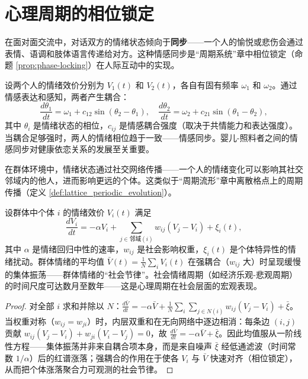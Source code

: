 \section{心理周期的相位锁定}

\begin{definition}[人际情感同步]\label{def:emotional_synchrony}
在面对面交流中，对话双方的情绪状态倾向于\textbf{同步}——一个人的愉悦或悲伤会通过表情、语调和肢体语言传递给对方。这种情感同步是“周期系统”章中相位锁定（命题 \ref{prop:phase-locking}）在人际互动中的实现。

设两个人的情绪效价分别为 $V_1(t)$ 和 $V_2(t)$，各自有固有频率 $\omega_1$ 和 $\omega_2$。通过情感表达和感知，两者产生耦合：
\[
\frac{d\theta_1}{dt} = \omega_1 + c_{12} \sin(\theta_2 - \theta_1), \quad \frac{d\theta_2}{dt} = \omega_2 + c_{21} \sin(\theta_1 - \theta_2),
\]
其中 $\theta_i$ 是情绪状态的相位，$c_{ij}$ 是情感耦合强度（取决于共情能力和表达强度）。当耦合足够强时，两人的情绪相位趋于一致——情感同步。婴儿-照料者之间的情感同步对健康依恋关系的发展至关重要。
\end{definition}

\begin{proposition}[群体情绪的传染性扩散]\label{prop:emotional_contagion}
在群体环境中，情绪状态通过社交网络传播——一个人的情绪变化可以影响其社交邻域内的他人，进而影响更远的个体。这类似于“周期流形”章中离散格点上的周期传播（定义 \ref{def:lattice_periodic_evolution}）。

设群体中个体 $i$ 的情绪效价 $V_i(t)$ 满足
\[
\frac{dV_i}{dt} = -\alpha V_i + \sum_{j \in \text{邻域}(i)} w_{ij} (V_j - V_i) + \xi_i(t),
\]
其中 $\alpha$ 是情绪回归中性的速率，$w_{ij}$ 是社会影响权重，$\xi_i(t)$ 是个体特异性的情绪扰动。群体情绪的平均值 $\bar{V}(t) = \frac{1}{N}\sum_i V_i(t)$ 在强耦合（$w_{ij}$ 大）时呈现缓慢的集体振荡——群体情绪的“社会节律”。社会情绪周期（如经济乐观-悲观周期）的时间尺度可达数月至数年——这是心理周期在社会层面的宏观表现。
\end{proposition}

\begin{proof}
对全部 $i$ 求和并除以 $N$：$\frac{d\bar V}{dt} = -\alpha \bar V + \frac{1}{N}\sum_{i} \sum_{j \in N(i)} w_{ij}(V_j - V_i) + \bar\xi$。当权重对称（$w_{ij} = w_{ji}$）时，内层双重和在无向网络中逐边相消：每条边 $(i,j)$ 贡献 $w_{ij}(V_j - V_i) + w_{ji}(V_i - V_j) = 0$，故 $\frac{d\bar V}{dt} = -\alpha \bar V + \bar\xi$。因此均值服从一阶线性方程——集体振荡并非来自耦合项本身，而是来自噪声 $\bar\xi$ 经低通滤波（时间常数 $1/\alpha$）后的红谱涨落；强耦合的作用在于使各 $V_i$ 与 $\bar V$ 快速对齐（相位锁定），从而把个体涨落聚合力可观测的社会节律。
\end{proof}

